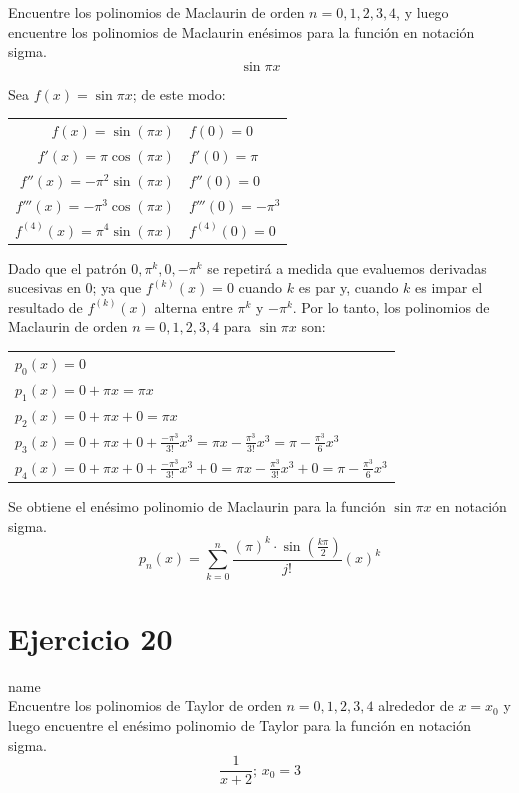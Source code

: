 \documentclass[12pt]{article}
\begin{document}
Encuentre los polinomios de Maclaurin de orden $n = 0, 1, 2, 3, 4$, y luego encuentre los polinomios de Maclaurin enésimos para la función en notación sigma.
\[\sin \pi x\]

Sea $f(x)=\sin \pi x$; de este modo:
\begin{center}
  \begin{tabular}{r l}
    $f(x)=\sin (\pi x)$ & $f(0)=0$ \\
    $f'(x)=\pi \cos (\pi x)$ & $f'(0)=\pi$ \\
    $f''(x)= - \pi ^2 \sin (\pi x)$ & $f''(0)=0$ \\
    $f'''(x)= - \pi ^3 \cos (\pi x)$ & $f'''(0)=-\pi ^3$ \\
    $f^{(4)}(x)= \pi ^4 \sin (\pi x)$ & $f^{(4)}(0)=0$ \\
  \end{tabular}
\end{center}
Dado que el patrón $0, \pi ^k, 0, -\pi ^k$ se repetirá a medida que evaluemos derivadas sucesivas en 0; ya que $f^{(k)}(x)=0$ cuando $k$ es par y, cuando $k$ es impar el resultado de $f^{(k)}(x)$ alterna entre $\pi ^k$ y $-\pi ^k$.
Por lo tanto, los polinomios de Maclaurin de orden $n = 0, 1, 2, 3, 4$ para $\sin \pi x$ son:
\begin{center}
  \begin{tabular}{l}
    $p_0(x)=0$ \\
    $p_1(x)=0+\pi x=\pi x$ \\
    $p_2(x)=0+\pi x+0=\pi x$ \\
    $p_3(x)=0+\pi x+0+\frac{-\pi ^3}{3!}x^3=\pi x- \frac{\pi ^3}{3!}x^3=\pi - \frac{\pi ^3}{6}x^3$ \\
    $p_4(x)=0+\pi x+0+\frac{-\pi ^3}{3!}x^3+0=\pi x - \frac{\pi ^3}{3!}x^3+0=\pi - \frac{\pi ^3}{6}x^3$ \\
  \end{tabular}
\end{center}
Se obtiene el enésimo polinomio de Maclaurin para la función $\sin \pi x$ en notación sigma.
\[
p_n(x)=\sum_{k=0}^{n} \frac{(\pi)^k \cdot \sin(\frac{k \pi }{2})}{j!}(x)^k
\]

\section{Ejercicio 20} name \\

Encuentre los polinomios de Taylor de orden $n = 0, 1, 2, 3, 4$ alrededor de $x = x_0$ y luego encuentre el enésimo polinomio de Taylor para la función en notación sigma.
\[\frac{1}{x+2}\text{; }x_0=3\]
\end{document}
